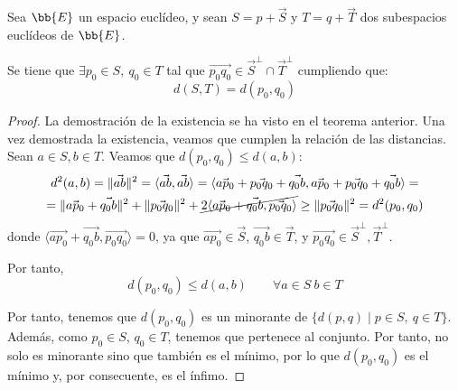\begin{coro}\label{coro:dist_ortogonal}
    Sea $\bb{E}$ un espacio euclídeo, y sean $S=p+\vec{S}$ y $T=q+\vec{T}$ dos subespacios euclídeos de $\bb{E}$.

    Se tiene que $\exists p_0\in S,~ q_0\in T$ tal que $\vec{p_0q_0}\in \vec{S}^\perp\cap \vec{T}^\perp$ cumpliendo que:
    \begin{equation*}
        d(S,T)=d(p_0,q_0)
    \end{equation*}
\end{coro}
\begin{proof}
    La demostración de la existencia se ha visto en el teorema anterior. Una vez demostrada la existencia, veamos que cumplen la relación de las distancias. Sean $a\in S, b\in T$. Veamos que $d(p_0,q_0)\leq d(a,b)$:
    \begin{multline*}
        d^2(a,b)=\|\vec{ab}\|^2= \langle\vec{ab},\vec{ab}\rangle = 
        \langle\vec{ap_0}+\vec{p_0q_0}+\vec{q_0b},\vec{ap_0}+\vec{p_0q_0}+\vec{q_0b}\rangle = \\=
        \|\vec{ap_0}+\vec{q_0b}\|^2 + \|\vec{p_0q_0}\|^2 + \cancel{2\langle\vec{ap_0}+\vec{q_0b},\vec{p_0q_0}\rangle} \geq \|\vec{p_0q_0}\|^2 = d^2(p_0,q_0)
    \end{multline*}
    donde $\langle\vec{ap_0}+\vec{q_0b},\vec{p_0q_0}\rangle=0$, ya que $\vec{ap_0}\in \vec{S}$, $\vec{q_0b}\in \vec{T}$, y $\vec{p_0q_0}\in \vec{S}^\perp,\vec{T}^\perp$.

    Por tanto,
    \begin{equation*}
        d(p_0,q_0)\leq d(a,b) \qquad \forall a\in S~b\in T
    \end{equation*}

    Por tanto, tenemos que $d(p_0,q_0)$ es un minorante de $\{d(p,q)\mid p\in S,~q\in T\}$. Además, como $p_0\in S$, $q_0\in T$, tenemos que pertenece al conjunto. Por tanto, no solo es minorante sino que también es el mínimo, por lo que $d(p_0,q_0)$ es el mínimo y, por consecuente, es el ínfimo.
\end{proof}

